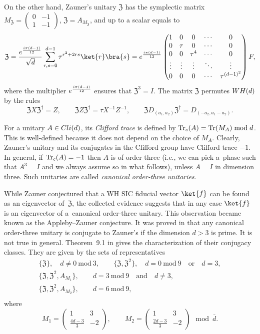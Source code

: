 \documentclass[11pt]{article}
\numberwithin{equation}{section}
\numberwithin{equation}{section}
\newcommand{\mmod}{\mathrm{~mod~}}
\newcommand{\bmp}{\begin{pmatrix}}
\newcommand{\emp}{\end{pmatrix}}
\DeclareMathOperator{\tr}{Tr}
\begin{document}
On the other hand, Zauner's unitary $\mathfrak{Z}$ has the symplectic matrix
$M_\mathfrak{Z} = \left(\begin{smallmatrix} 0 & -1 \\ 1 & -1 \end{smallmatrix}\right)$, $\mathfrak{Z} = A_{M_\mathfrak{Z}}$,
and up to a scalar equals to
\[
\mathfrak{Z} = \frac{{\rm e}^{\frac{{\rm i}\pi (d-1)}{12}}}{\sqrt{d}} \sum_{r,s=0}^{d-1} \tau^{r^2+2rs}\ket{r}\bra{s}
= {\rm e}^{\frac{{\rm i}\pi (d-1)}{12}}\bmp
1 & 0 & 0 & \cdots & 0\\
0 & \tau & 0 & \cdots & 0\\
0 & 0 & \tau^4 & \cdots & 0\\
\vdots & \vdots & \vdots & \ddots & \vdots\\
0 & 0 & 0 & \cdots & \tau^{(d-1)^2}\\
\emp F,
\]
where the multiplier ${\rm e}^{\frac{{\rm i}\pi (d-1)}{12}}$ ensures that $\mathfrak{Z}^3 = I$.
The matrix $\mathfrak{Z}$ permutes ${\rm WH}(d)$ by the rules
\[
\mathfrak{Z}X\mathfrak{Z}^\dag = Z,
\qquad
\mathfrak{Z}Z\mathfrak{Z}^\dag = \tau X^{-1}Z^{-1},
\qquad
\mathfrak{Z}D_{(a_1, a_2)}\mathfrak{Z}^\dag = D_{(-a_2, a_1-a_2)}.
\]

For a unitary $A \in {\rm Cli}(d)$, its \textit{Clifford trace} is defined by
$\tr_{{\rm c}}(A) =\tr(M_A) \bmod d$.
This is well-defined because it does not depend on the choice of $M_A$.
Clearly, Zauner's unitary and its conjugates in the Clifford group have Clifford trace $-1$.
In general, if $\tr_{{\rm c}}(A)=-1$ then $A$ is of order three
(i.e., we can pick a~phase such that $A^3=I$
and we always assume so in what follows),
unless $A=I$ in dimension three. Such unitaries are called \textit{canonical order-three unitaries}.

While Zauner conjectured that a WH SIC fiducial vector $\ket{f}$ can be
found as an eigenvector of~$\mathfrak{Z}$, the collected evidence suggests
that in any case $\ket{f}$ is an eigenvector of a~canonical order-three unitary.
This observation became known as the Appleby--Zauner conjecture.
It was proved in \cite{Fla} that any canonical order-three unitary is conjugate
to Zauner's if the dimension $d>3$ is prime. It is not true in general.
Theorem~9.1 in \cite{BosWal}
gives the characterization of their conjugacy classes. They are given by the sets of
representatives
\begin{gather*}
 \{\mathfrak{Z}\}, \quad d\neq0 \mmod 3, \qquad
 \bigl\{\mathfrak{Z}, \mathfrak{Z}^2\bigr\}, \quad d=0 \mmod 9 \quad\text{or} \quad d=3, \\
 \bigl\{\mathfrak{Z}, \mathfrak{Z}^2, A_{M_1}\bigr\}, \qquad d=3\mmod 9 \quad\text{and}\quad d \neq 3, \\
 \bigl\{\mathfrak{Z}, \mathfrak{Z}^2, A_{M_2}\bigr\}, \qquad d=6\mmod 9, \\
\end{gather*}
where
\[
M_1 = \bmp 1 & 3 \\ \frac{4d-3}{3} & -2 \emp,
\qquad
M_2 = \bmp 1 & 3 \\ \frac{2d-3}{3} & -2 \emp \mod \bar{d}.
\]
\end{document}
